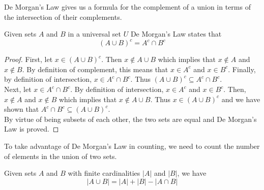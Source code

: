 \documentclass[handout]{ximera}
\begin{document}
De Morgan's Law gives us a formula for the complement of a union in terms of the intersection of their complements.

\begin{proposition}
Given sets $A$ and $B$ in a universal set $U$ De Morgan's Law states that
\[
\left(A \cup B\right)^c = A^c \cap B^c
\]
\end{proposition}

\begin{proof}
First, let $x \in (A \cup B)^c$.  Then  $x \notin A \cup B$ which implies that $x \notin A$ and $x \notin B$. 
By definition of complement, this means that $x \in A^c$ and $x \in B^c$.   
Finally, by definition of intersection, $x \in A^c \cap B^c$.
Thus $(A \cup B)^c \subseteq A^c \cap B^c$.\\
Next, let $x \in A^c \cap B^c$. By definition of intersection, $x \in A^c$ and $x \in B^c$. 
Then, $x \notin A$ and $x \notin B$ which implies that $x \notin A \cup B$. Thus $x \in (A \cup B)^c$ and 
we have shown that  $A^c \cap B^c\subseteq (A \cup B)^c $.\\
By virtue of being subsets of each other, the two sets are equal and De Morgan's Law is proved.
\end{proof}

To take advantage of De Morgan's Law in counting, we need  to count the number of elements in the union of two sets.

\begin{proposition}
Given sets $A$ and $B$ with finite cardinalities $|A|$ and $|B|$, we have
\[
|A \cup B| = |A| + |B| - |A \cap B|
\]
\end{proposition}
\end{document}
